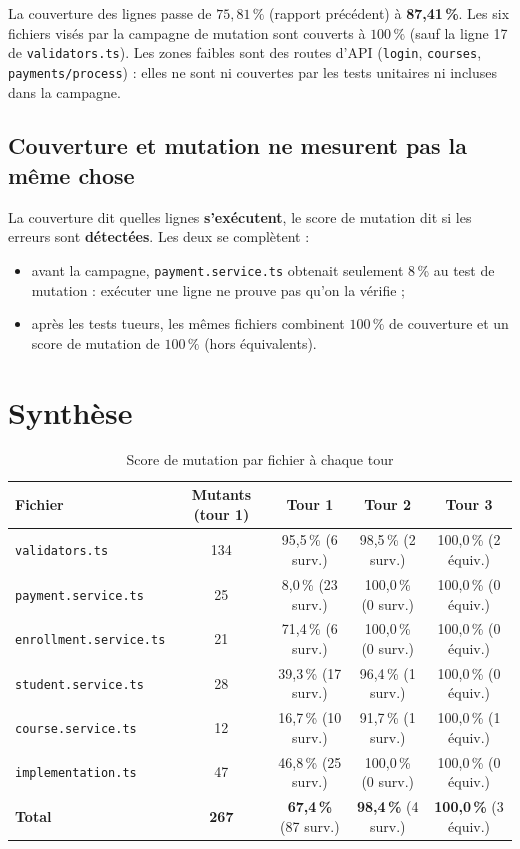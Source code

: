 \documentclass[12pt,a4paper]{article}
\begin{document}
La couverture des lignes passe de $75{,}81\,\%$ (rapport précédent) à \textbf{87,41\,\%}. Les six fichiers visés par la campagne de mutation sont couverts à $100\,\%$ (sauf la ligne 17 de \texttt{validators.ts}). Les zones faibles sont des routes d'API (\texttt{login}, \texttt{courses}, \texttt{payments/process}) : elles ne sont ni couvertes par les tests unitaires ni incluses dans la campagne.

\subsection{Couverture et mutation ne mesurent pas la même chose}
La couverture dit quelles lignes \textbf{s'exécutent}, le score de mutation dit si les erreurs sont \textbf{détectées}. Les deux se complètent :
\begin{itemize}
    \item avant la campagne, \texttt{payment.service.ts} obtenait seulement 8\,\% au test de mutation : exécuter une ligne ne prouve pas qu'on la vérifie ;
    \item après les tests tueurs, les mêmes fichiers combinent $100\,\%$ de couverture et un score de mutation de $100\,\%$ (hors équivalents).
\end{itemize}


\section{Synthèse}
\begin{table}[H]
\centering
\footnotesize
\begin{tabular}{lcccc}
\toprule
\textbf{Fichier} & \textbf{Mutants (tour 1)} & \textbf{Tour 1} & \textbf{Tour 2} & \textbf{Tour 3} \\
\midrule
\texttt{validators.ts} & 134 & 95{,}5\,\% (6 surv.) & 98{,}5\,\% (2 surv.) & 100{,}0\,\% (2 équiv.) \\
\texttt{payment.service.ts} & 25 & 8{,}0\,\% (23 surv.) & 100{,}0\,\% (0 surv.) & 100{,}0\,\% (0 équiv.) \\
\texttt{enrollment.service.ts} & 21 & 71{,}4\,\% (6 surv.) & 100{,}0\,\% (0 surv.) & 100{,}0\,\% (0 équiv.) \\
\texttt{student.service.ts} & 28 & 39{,}3\,\% (17 surv.) & 96{,}4\,\% (1 surv.) & 100{,}0\,\% (0 équiv.) \\
\texttt{course.service.ts} & 12 & 16{,}7\,\% (10 surv.) & 91{,}7\,\% (1 surv.) & 100{,}0\,\% (1 équiv.) \\
\texttt{implementation.ts} & 47 & 46{,}8\,\% (25 surv.) & 100{,}0\,\% (0 surv.) & 100{,}0\,\% (0 équiv.) \\
\midrule
\textbf{Total} & \textbf{267} & \textbf{67{,}4\,\%} (87 surv.) & \textbf{98{,}4\,\%} (4 surv.) & \textbf{100{,}0\,\%} (3 équiv.) \\

\bottomrule
\end{tabular}
\caption{Score de mutation par fichier à chaque tour}
\label{tab:synthese}
\end{table}
\end{document}
